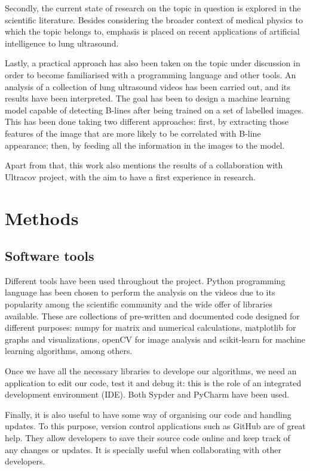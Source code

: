 \documentclass[11pt]{article} %
\begin{document}
	Secondly, the current state of research on the topic in question is explored in the scientific literature. Besides considering the broader context of medical physics to which the topic belongs to, emphasis is placed on recent applications of artificial intelligence to lung ultrasound.

	Lastly, a practical approach has also been taken on the topic under discussion in order to become familiarised with a programming language and other tools. An analysis of a collection of lung ultrasound videos has been carried out, and its results have been interpreted. The goal has been to design a machine learning model capable of detecting B-lines after being trained on a set of labelled images. This has been done taking two different approaches: first, by extracting those features of the image that are more likely to be correlated with B-line appearance; then, by feeding all the information in the images to the model.
	
	Apart from that, this work also mentions the results of a collaboration with Ultracov project, with the aim to have a first experience in research.
	
	
\section{Methods}

\subsection{Software tools}
	Different tools have been used throughout the project. Python programming language has been chosen to perform the analysis on the videos due to its popularity among the scientific community and the wide offer of libraries available. These are collections of pre-written and documented code designed for different purposes: numpy for matrix and numerical calculations, matplotlib for graphs and visualizations, openCV for image analysis and scikit-learn for machine learning algorithms, among others.

	Once we have all the necessary libraries to develope our algorithms, we need an application to edit our code, test it and debug it: this is the role of an integrated development environment (IDE). Both Sypder and PyCharm have been used.
	
	Finally, it is also useful to have some way of organising our code and handling updates. To this purpose, version control applications such as GitHub are of great help. They allow developers to save their source code online and keep track of any changes or updates. It is specially useful when collaborating with other developers.
\end{document}
